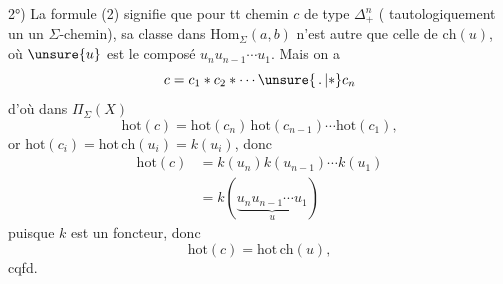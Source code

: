 2°) La formule (2) signifie que pour tt chemin $c$ de type $\Delta_+^n$ ( tautologiquement un
un $\Sigma$-chemin),  sa classe dans $\mathrm{Hom}_\Sigma(a,b)$ n'est autre que celle de $\mathrm{ch}(u)$, où $\unsure{u}$ est le composé $u_nu_{n-1}\cdots u_1$. Mais on a
\[c=c_1*c_2*\cdots\unsure{\,.\,|*}c_n\]
d'où dans $\Pi_\Sigma(X)$
\[\mathrm{hot}(c)=\mathrm{hot}(c_n)\,\mathrm{hot}(c_{n-1})\cdots\mathrm{hot}(c_1),\]
or $\mathrm{hot}(c_i)=\mathrm{hot}\,\mathrm{ch}(u_i)=k(u_i)$, donc
\[\begin{aligned}\mathrm{hot}(c)&=k(u_n)k(u_{n-1})\cdots k(u_1)\\
&=k(\underbrace{u_nu_{n-1}\cdots u_1}_{u})\end{aligned}\]
puisque $k$ est un foncteur, \deleted{\unsure{$=$}} donc
\[\mathrm{hot}(c)=\mathrm{hot}\,\mathrm{ch}(u),\]
cqfd.

